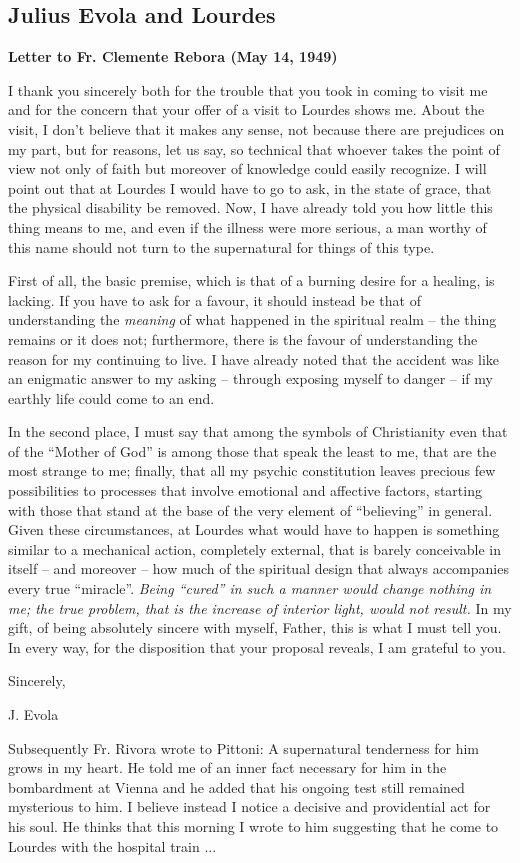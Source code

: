 \subsection{Julius Evola and Lourdes}

\textbf{Letter to Fr. Clemente Rebora (May 14, 1949)}

I thank you sincerely both for the trouble that you took in coming to visit me and for the concern that your offer of a visit to Lourdes shows me. About the visit, I don't believe that it makes any sense, not because there are prejudices on my part, but for reasons, let us say, so technical that whoever takes the point of view not only of faith but moreover of knowledge could easily recognize. I will point out that at Lourdes I would have to go to ask, in the state of grace, that the physical disability be removed. Now, I have already told you how little this thing means to me, and even if the illness were more serious, a man worthy of this name should not turn to the supernatural for things of this type.

First of all, the basic premise, which is that of a burning desire for a healing, is lacking. If you have to ask for a favour, it should instead be that of understanding the \emph{meaning} of what happened in the spiritual realm -- the thing remains or it does not; furthermore, there is the favour of understanding the reason for my continuing to live. I have already noted that the accident was like an enigmatic answer to my asking -- through exposing myself to danger -- if my earthly life could come to an end.

In the second place, I must say that among the symbols of Christianity even that of the ``Mother of God'' is among those that speak the least to me, that are the most strange to me; finally, that all my psychic constitution leaves precious few possibilities to processes that involve emotional and affective factors, starting with those that stand at the base of the very element of ``believing'' in general. Given these circumstances, at Lourdes what would have to happen is something similar to a mechanical action, completely external, that is barely conceivable in itself -- and moreover -- how much of the spiritual design that always accompanies every true ``miracle''. \emph{Being ``cured'' in such a manner would change nothing in me; the true problem, that is the increase of interior light, would not result.} In my gift, of being absolutely sincere with myself, Father, this is what I must tell you. In every way, for the disposition that your proposal reveals, I am grateful to you.

Sincerely,

J. Evola

\begin{quotex}
Subsequently Fr. Rivora wrote to Pittoni: A supernatural tenderness for him grows in my heart. He told me of an inner fact necessary for him in the bombardment at Vienna and he added that his ongoing test still remained mysterious to him. I believe instead I notice a decisive and providential act for his soul. He thinks that this morning I wrote to him suggesting that he come to Lourdes with the hospital train ...
\end{quotex}

